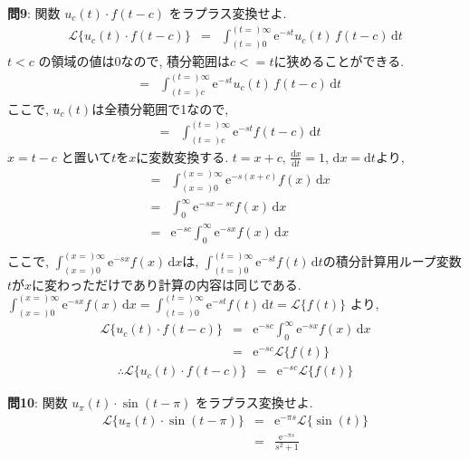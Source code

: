 ﻿\documentclass[a4j]{jarticle}
\begin{document}
\noindent
{\large {\bf 問9}}: 関数 \( u_c(t)\cdot f(t-c) \) をラプラス変換せよ.
\begin{eqnarray*}
\mathcal{L} \{ u_c(t)\cdot f(t-c) \} &=& \int_{(t=)0}^{(t=)\infty}{ \mathrm{e}^{-st} u_c(t) \, f(t-c) \, \mathrm{d}t}
\end{eqnarray*}
%
\( t<c \) の領域の値は0なので, 積分範囲は\( c <= t \)に狭めることができる.
%
\begin{eqnarray*}
 &=& \int_{(t=)c}^{(t=)\infty}{ \mathrm{e}^{-st} u_c(t) \, f(t-c) \, \mathrm{d}t}
\end{eqnarray*}
%
ここで, \( u_c(t) \)は全積分範囲で1なので,
%
\begin{eqnarray*}
 &=& \int_{(t=)c}^{(t=)\infty}{ \mathrm{e}^{-st} f(t-c) \, \mathrm{d}t}
\end{eqnarray*}
%
\( x = t-c \) と置いて\(t\)を\(x\)に変数変換する. \( t = x + c ,\, \frac{\mathrm{d}x}{\mathrm{d}t}=1 ,\, \mathrm{d}x = \mathrm{d}t \)より,
%
\begin{eqnarray*}
 &=& \int_{(x=)0}^{(x=)\infty}{ \mathrm{e}^{-s(x+c)} f(x) \, \mathrm{d}x} \\
 &=& \int_0^\infty{ \mathrm{e}^{-sx-sc} f(x) \, \mathrm{d}x} \\
 &=& \mathrm{e}^{-sc} \int_0^\infty{ \mathrm{e}^{-sx} f(x) \, \mathrm{d}x} \\
\end{eqnarray*}
%
ここで,  \( \int_{(x=)0}^{(x=)\infty}{ \mathrm{e}^{-sx} f(x) \, \mathrm{d}x} \)は,
\( \int_{(t=)0}^{(t=)\infty}{ \mathrm{e}^{-st} f(t) \, \mathrm{d}t} \)の積分計算用ループ変数\(t\)が\(x\)に変わっただけであり計算の内容は同じである.
\( \int_{(x=)0}^{(x=)\infty}{ \mathrm{e}^{-sx} f(x) \, \mathrm{d}x} = \int_{(t=)0}^{(t=)\infty}{ \mathrm{e}^{-st} f(t) \, \mathrm{d}t} = \mathcal{L} \{ f(t) \} \) より,
%
\begin{eqnarray*}
\mathcal{L} \{ u_c(t)\cdot f(t-c) \} &=& \mathrm{e}^{-sc} \int_0^\infty{ \mathrm{e}^{-sx} f(x) \, \mathrm{d}x} \\
                                     &=& \mathrm{e}^{-sc} \mathcal{L} \{ f(t) \}
\end{eqnarray*}
%
\begin{eqnarray*}
\therefore \mathcal{L} \{ u_c(t)\cdot f(t-c) \} &=& \mathrm{e}^{-sc} \mathcal{L} \{ f(t) \}
\end{eqnarray*}

\noindent
{\large {\bf 問10}}: 関数 \( u_\pi(t)\cdot \sin(t-\pi) \) をラプラス変換せよ.
\begin{eqnarray*}
\mathcal{L} \{ u_\pi(t)\cdot \sin(t-\pi) \} &=& \mathrm{e}^{-\pi s} \mathcal{L} \{ \sin(t) \} \\
                                            &=& \frac{ \mathrm{e}^{-\pi s} }{s^2+1}
\end{eqnarray*}
\end{document}
